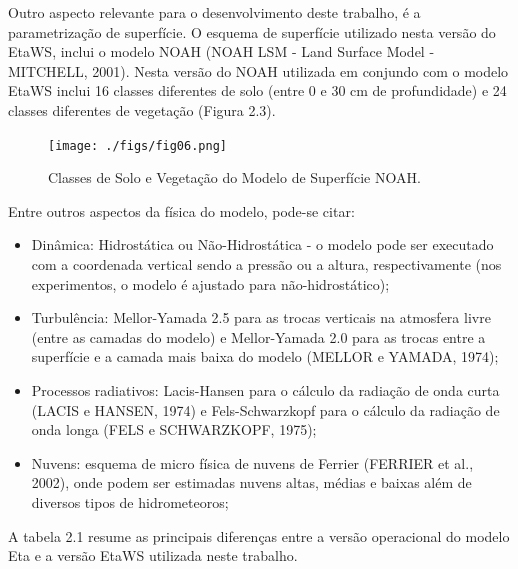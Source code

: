Outro aspecto relevante para o desenvolvimento deste trabalho, é a parametrização de superfície. O esquema de superfície utilizado nesta versão do EtaWS, inclui o modelo NOAH (NOAH LSM - Land Surface Model - MITCHELL, 2001). Nesta versão do NOAH utilizada em conjundo com o modelo EtaWS inclui 16 classes diferentes de solo (entre 0 e 30 cm de profundidade) e 24 classes diferentes de vegetação (Figura 2.3).

\begin{figure}
\centering
\texttt{[image: ./figs/fig06.png]}
\caption{Classes de Solo e Vegetação do Modelo de Superfície NOAH.}
\label{fig06}
\end{figure}

Entre outros aspectos da física do modelo, pode-se citar:

\begin{itemize}
\item Dinâmica: Hidrostática ou Não-Hidrostática - o modelo pode ser executado com a coordenada vertical sendo a pressão ou a altura, respectivamente (nos experimentos, o modelo é ajustado para não-hidrostático);
\item Turbulência: Mellor-Yamada 2.5 para as trocas verticais na atmosfera livre (entre as camadas do modelo) e Mellor-Yamada 2.0 para as trocas entre a superfície e a camada mais baixa do modelo (MELLOR e YAMADA, 1974);
\item Processos radiativos: Lacis-Hansen para o cálculo da radiação de onda curta (LACIS e HANSEN, 1974) e Fels-Schwarzkopf para o cálculo da radiação de onda longa (FELS e SCHWARZKOPF, 1975);
\item Nuvens: esquema de micro física de nuvens de Ferrier (FERRIER et al., 2002), onde podem ser estimadas nuvens altas, médias e baixas além de diversos tipos de hidrometeoros;
\end{itemize}

A tabela 2.1 resume as principais diferenças entre a versão operacional do modelo Eta e a versão EtaWS utilizada neste trabalho.

